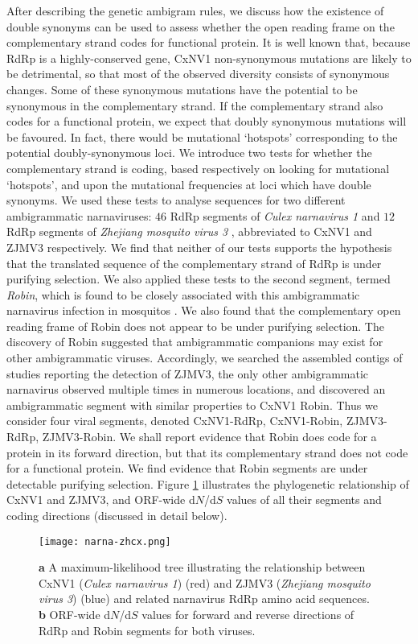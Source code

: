 \documentclass[unnumsec,webpdf,contemporary,large]{oup-authoring-template}%
\theoremstyle{thmstyleone}%
\theoremstyle{thmstyletwo}%
\theoremstyle{thmstylethree}%
\begin{document}
After describing the genetic ambigram rules, we discuss how the existence of double synonyms
can be used to assess whether the open reading frame on the complementary strand codes for
functional protein. It is well known that, because RdRp is a highly-conserved gene, CxNV1
non-synonymous mutations are likely to be detrimental, so that most of the observed
diversity consists of synonymous changes. Some of these synonymous
mutations have the potential to be synonymous in the complementary strand. If the complementary
strand also codes for a functional protein, we expect that doubly synonymous mutations will be
favoured. In fact, there would be mutational \lq hotspots' corresponding to the potential
doubly-synonymous loci. We introduce two tests for whether the complementary strand
is coding, based respectively on looking for mutational \lq hotspots', and upon the mutational
frequencies at loci which have double synonyms. We used these tests to analyse sequences for
two different ambigrammatic narnaviruses: $46$ RdRp segments of \emph{Culex narnavirus 1}
\citep{Goertz2019} and $12$ RdRp segments of \emph{Zhejiang mosquito virus 3} \citep{shi_17}, abbreviated
to CxNV1 and ZJMV3 respectively.
We find that neither of our tests supports the hypothesis
that the translated sequence of the complementary strand of RdRp
is under purifying selection. We also applied these tests to the second segment,
termed \emph{Robin}, which is found to be closely associated with this
ambigrammatic narnavirus infection in mosquitos \citep{Bat+20,Ret+20}. We also found that the
complementary open reading frame of Robin does not appear to be under purifying selection.
The discovery of Robin suggested that ambigrammatic companions may exist for
other ambigrammatic viruses. Accordingly, we searched the assembled contigs of
studies reporting the detection of ZJMV3, the only other ambigrammatic narnavirus
observed multiple times in numerous locations,
and discovered an ambigrammatic segment with similar properties to CxNV1 Robin.
Thus we consider four viral segments, denoted CxNV1-RdRp, CxNV1-Robin, ZJMV3-RdRp, ZJMV3-Robin.
We shall report evidence that Robin does code for a protein in its forward direction, but that its
complementary strand does not code for a functional protein. We find
evidence that Robin segments are under detectable
purifying selection. Figure \ref{fig: 1} illustrates the phylogenetic relationship of
CxNV1 and ZJMV3, and ORF-wide d$N$/d$S$ values of all their segments and coding directions
(discussed in detail below).

\begin{figure}
\begin{center}
\texttt{[image: narna-zhcx.png]}
\caption{\label{fig: 1}
{\bf a} A maximum-likelihood tree illustrating the relationship between CxNV1 (\emph{Culex narnavirus 1}) (red) and
ZJMV3 (\emph{Zhejiang mosquito virus 3}) (blue) and related narnavirus RdRp amino acid sequences. {\bf b} ORF-wide d$N$/d$S$ values for forward and
reverse directions of RdRp and Robin segments for both viruses.
}
\end{center}
\end{figure}
\end{document}
